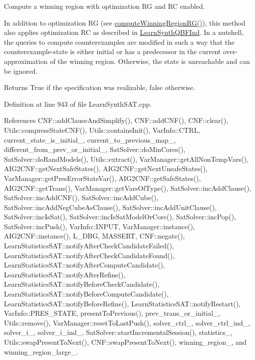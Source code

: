 Compute a winning region with optimization R\-G and R\-C enabled. 

In addition to optimization R\-G (see \hyperlink{classLearnSynthSAT_aa981048565f10183c30c4dc0576de6b6}{compute\-Winning\-Region\-R\-G()}), this method also applies optimization R\-C as described in \hyperlink{classLearnSynthQBFInd}{Learn\-Synth\-Q\-B\-F\-Ind}. In a nutshell, the queries to compute counterexamples are modified in such a way that the counterexample-\/state is either initial or has a predecessor in the current over-\/approximation of the winning region. Otherwise, the state is unreachable and can be ignored.

\begin{DoxyReturn}{Returns}
True if the specification was realizable, false otherwise. 
\end{DoxyReturn}


Definition at line 943 of file Learn\-Synth\-S\-A\-T.\-cpp.



References C\-N\-F\-::add\-Clause\-And\-Simplify(), C\-N\-F\-::add\-C\-N\-F(), C\-N\-F\-::clear(), Utils\-::compress\-State\-C\-N\-F(), Utils\-::contains\-Init(), Var\-Info\-::\-C\-T\-R\-L, current\-\_\-state\-\_\-is\-\_\-initial\-\_\-, current\-\_\-to\-\_\-previous\-\_\-map\-\_\-, different\-\_\-from\-\_\-prev\-\_\-or\-\_\-initial\-\_\-, Sat\-Solver\-::do\-Min\-Cores(), Sat\-Solver\-::do\-Rand\-Models(), Utils\-::extract(), Var\-Manager\-::get\-All\-Non\-Temp\-Vars(), A\-I\-G2\-C\-N\-F\-::get\-Next\-Safe\-States(), A\-I\-G2\-C\-N\-F\-::get\-Next\-Unsafe\-States(), Var\-Manager\-::get\-Pres\-Error\-State\-Var(), A\-I\-G2\-C\-N\-F\-::get\-Safe\-States(), A\-I\-G2\-C\-N\-F\-::get\-Trans(), Var\-Manager\-::get\-Vars\-Of\-Type(), Sat\-Solver\-::inc\-Add\-Clause(), Sat\-Solver\-::inc\-Add\-C\-N\-F(), Sat\-Solver\-::inc\-Add\-Cube(), Sat\-Solver\-::inc\-Add\-Neg\-Cube\-As\-Clause(), Sat\-Solver\-::inc\-Add\-Unit\-Clause(), Sat\-Solver\-::inc\-Is\-Sat(), Sat\-Solver\-::inc\-Is\-Sat\-Model\-Or\-Core(), Sat\-Solver\-::inc\-Pop(), Sat\-Solver\-::inc\-Push(), Var\-Info\-::\-I\-N\-P\-U\-T, Var\-Manager\-::instance(), A\-I\-G2\-C\-N\-F\-::instance(), L\-\_\-\-D\-B\-G, M\-A\-S\-S\-E\-R\-T, C\-N\-F\-::negate(), Learn\-Statistics\-S\-A\-T\-::notify\-After\-Check\-Candidate\-Failed(), Learn\-Statistics\-S\-A\-T\-::notify\-After\-Check\-Candidate\-Found(), Learn\-Statistics\-S\-A\-T\-::notify\-After\-Compute\-Candidate(), Learn\-Statistics\-S\-A\-T\-::notify\-After\-Refine(), Learn\-Statistics\-S\-A\-T\-::notify\-Before\-Check\-Candidate(), Learn\-Statistics\-S\-A\-T\-::notify\-Before\-Compute\-Candidate(), Learn\-Statistics\-S\-A\-T\-::notify\-Before\-Refine(), Learn\-Statistics\-S\-A\-T\-::notify\-Restart(), Var\-Info\-::\-P\-R\-E\-S\-\_\-\-S\-T\-A\-T\-E, present\-To\-Previous(), prev\-\_\-trans\-\_\-or\-\_\-initial\-\_\-, Utils\-::remove(), Var\-Manager\-::reset\-To\-Last\-Push(), solver\-\_\-ctrl\-\_\-, solver\-\_\-ctrl\-\_\-ind\-\_\-, solver\-\_\-i\-\_\-, solver\-\_\-i\-\_\-ind\-\_\-, Sat\-Solver\-::start\-Incremental\-Session(), statistics\-\_\-, Utils\-::swap\-Present\-To\-Next(), C\-N\-F\-::swap\-Present\-To\-Next(), winning\-\_\-region\-\_\-, and winning\-\_\-region\-\_\-large\-\_\-.



